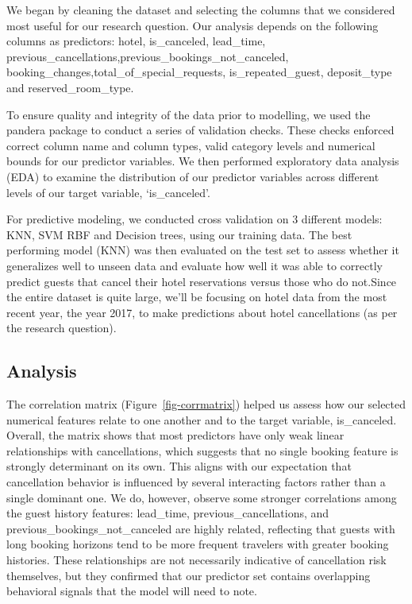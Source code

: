 \documentclass[
  letterpaper,
  DIV=11,
  numbers=noendperiod]{scrartcl}
\begin{document}
We began by cleaning the dataset and selecting the columns that we
considered most useful for our research question. Our analysis depends
on the following columns as predictors: hotel, is\_canceled, lead\_time,
previous\_cancellations,previous\_bookings\_not\_canceled,
booking\_changes,total\_of\_special\_requests, is\_repeated\_guest,
deposit\_type and reserved\_room\_type.

To ensure quality and integrity of the data prior to modelling, we used
the pandera package to conduct a series of validation checks. These
checks enforced correct column name and column types, valid category
levels and numerical bounds for our predictor variables. We then
performed exploratory data analysis (EDA) to examine the distribution of
our predictor variables across different levels of our target variable,
`is\_canceled'.

For predictive modeling, we conducted cross validation on 3 different
models: KNN, SVM RBF and Decision trees, using our training data. The
best performing model (KNN) was then evaluated on the test set to assess
whether it generalizes well to unseen data and evaluate how well it was
able to correctly predict guests that cancel their hotel reservations
versus those who do not.Since the entire dataset is quite large, we'll
be focusing on hotel data from the most recent year, the year 2017, to
make predictions about hotel cancellations (as per the research
question).

\subsection{Analysis}\label{analysis}

The correlation matrix (Figure~\ref{fig-corrmatrix}) helped us assess
how our selected numerical features relate to one another and to the
target variable, is\_canceled. Overall, the matrix shows that most
predictors have only weak linear relationships with cancellations, which
suggests that no single booking feature is strongly determinant on its
own. This aligns with our expectation that cancellation behavior is
influenced by several interacting factors rather than a single dominant
one. We do, however, observe some stronger correlations among the guest
history features: lead\_time, previous\_cancellations, and
previous\_bookings\_not\_canceled are highly related, reflecting that
guests with long booking horizons tend to be more frequent travelers
with greater booking histories. These relationships are not necessarily
indicative of cancellation risk themselves, but they confirmed that our
predictor set contains overlapping behavioral signals that the model
will need to note.
\end{document}
